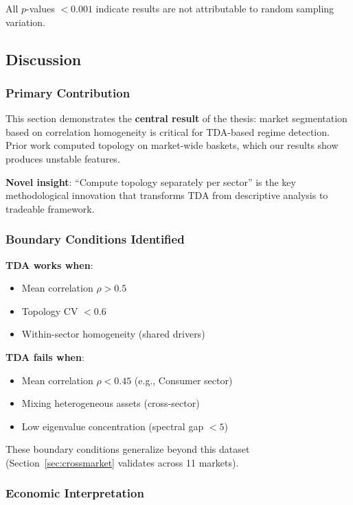 All $p$-values $< 0.001$ indicate results are not attributable to random sampling variation.

\subsection{Discussion}

\subsubsection{Primary Contribution}

This section demonstrates the \textbf{central result} of the thesis: market segmentation based on correlation homogeneity is critical for TDA-based regime detection. Prior work \citep{Gidea2018, Meng2021} computed topology on market-wide baskets, which our results show produces unstable features.

\textbf{Novel insight}: ``Compute topology separately per sector'' is the key methodological innovation that transforms TDA from descriptive analysis to tradeable framework.

\subsubsection{Boundary Conditions Identified}

\textbf{TDA works when}:
\begin{itemize}
    \item Mean correlation $\rho > 0.5$
    \item Topology CV $< 0.6$
    \item Within-sector homogeneity (shared drivers)
\end{itemize}

\textbf{TDA fails when}:
\begin{itemize}
    \item Mean correlation $\rho < 0.45$ (e.g., Consumer sector)
    \item Mixing heterogeneous assets (cross-sector)
    \item Low eigenvalue concentration (spectral gap $< 5$)
\end{itemize}

These boundary conditions generalize beyond this dataset (Section~\ref{sec:crossmarket} validates across 11 markets).

\subsubsection{Economic Interpretation}

